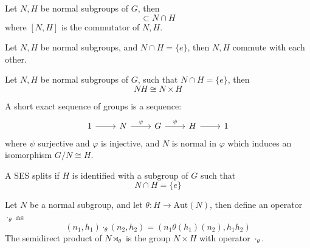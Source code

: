 \documentclass[openany]{book}
\begin{document}
\begin{prop}
    Let $N,H$ be normal subgroups of $G$, then 
    \begin{equation*}
        [N,H]\subset N\cap H
    \end{equation*}
    where $[N,H]$ is the commutator of $N,H$.
\end{prop}

\begin{prop}
    Let $N,H$ be normal subgroups, and $N\cap H=\{e\}$, then $N,H$ commute with each other.
\end{prop}

\begin{thm}
    Let $N,H$ be normal subgroups of $G$, such that $N\cap H=\{e\}$, then 
    \begin{equation*}
        NH\cong N\times H
    \end{equation*}
\end{thm}


\begin{defn}
    A short exact sequence of groups is a sequence:
    \[\begin{tikzcd}
        1 & N & G & H & 1
        \arrow[from=1-1, to=1-2]
        \arrow["\varphi", from=1-2, to=1-3]
        \arrow["\psi", from=1-3, to=1-4]
        \arrow[from=1-4, to=1-5]
    \end{tikzcd}\]
    where $\psi$ surjective and $\varphi$ is injective, and $N$ is normal in $\varphi$ which induces an isomorphism $G/N\cong H$.

    A SES splits if $H$ is identified with a subgroup of $G$ such that 
    \begin{equation*}
        N\cap H=\{e\}
    \end{equation*}
\end{defn}


\begin{defn}
    Let $N$ be a normal subgroup, and let $\theta: H\to\text{Aut}(N)$, then define an operator $\cdot_\theta$ as 
    \begin{equation*}
        (n_1,h_1)\cdot_\theta(n_2,h_2)=(n_1\theta(h_1)(n_2), h_1h_2)
    \end{equation*}
    The semidirect product of $N\rtimes_\theta$ is the group $N\times H$ with operator $\cdot_\theta$.
\end{defn}
\end{document}
